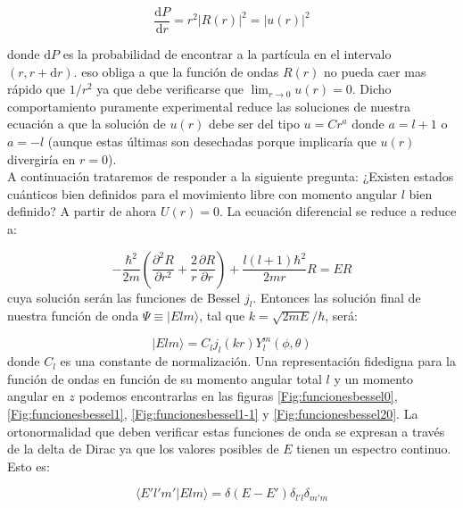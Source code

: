 \documentclass[12pt]{article}
\newcommand{\parentesis}[1]{\left( #1  \right)}
\newcommand{\parciales}[2]{\frac{\partial #1}{\partial #2}}
\newcommand{\D}{\mathrm{d}}
\begin{document}
\begin{equation}
\dfrac{\D P}{\D r} = r^2 |R(r)|^2 = |u(r)|^2
\end{equation}

donde $\D P$ es la probabilidad de encontrar a la partícula en el intervalo $(r,r+\D r)$. eso obliga a que la función de ondas $R(r)$ no pueda caer mas rápido que $1/r^2$ ya que debe verificarse que $\lim_{r \rightarrow 0} u(r) = 0$. Dicho comportamiento puramente experimental reduce las soluciones de nuestra ecuación a que la solución de $u(r)$ debe ser del tipo $u=Cr^a$ donde $a=l+1$ o $a=-l$ (aunque estas últimas son desechadas porque implicaría que $u(r)$ divergiría en $r = 0$). \\

A continuación trataremos de responder a la siguiente pregunta: ¿Existen estados cuánticos bien definidos para el movimiento libre con momento angular $l$ bien definido?  A partir de ahora $U(r)=0$. La ecuación diferencial se reduce a reduce a:

\begin{equation}
-\dfrac{\hbar^2}{2 m} \parentesis{\parciales{^2R}{r^2}+ \dfrac{2}{r} \parciales{R}{r}} + \dfrac{l(l+1) \hbar^2}{2mr} R = E R
\end{equation}
cuya solución serán las funciones de Bessel $j_l$. Entonces las solución final de nuestra función de onda $\Psi \equiv | E l m \rangle$, tal que $k = \sqrt{2mE}/\hbar$, será:

\begin{equation}
| E l m \rangle = C_l j_l (kr) Y_l^m (\phi,\theta) 
\end{equation}
donde $C_l$ es una constante de normalización. Una representación fidedigna para la función de ondas en función de su momento angular total $l$ y un momento angular en $z$ podemos encontrarlas en las  figuras \ref{Fig:funcionesbessel0}, \ref{Fig:funcionesbessel1}, \ref{Fig:funcionesbessel1-1} y \ref{Fig:funcionesbessel20}. La ortonormalidad que deben verificar estas funciones de onda se expresan a través de la delta de Dirac ya que los valores posibles de $E$ tienen un espectro continuo. Esto es:

\begin{equation}
\langle E' l' m' | E l m \rangle = \delta (E-E') \delta_{l'l} \delta_{m'm}
\end{equation}
\end{document}
